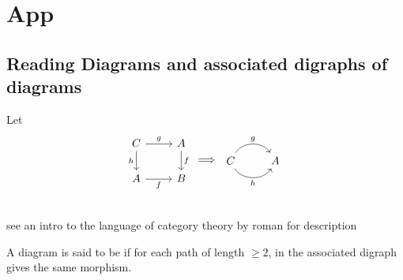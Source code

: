\documentclass{book}
\begin{document}
	
	
	
	
	
	
	
	
	
	
	
	
	
	
	
	
	
	
	
	
	
	
	
	
	
	
	
	
	
	
	
	\appendix
	\chapter{App}
	
	\section{Reading Diagrams and associated digraphs of diagrams}
	
	\begin{defn}
		Let 
		\[ 
		\begin{tikzcd}[baseline= 7]
			C \arrow[r, "g"] \arrow[d, "h"'] & A \arrow[d, "f"] \\
			A \arrow[r, "f"'] & B\\
		\end{tikzcd}
		\implies
		\begin{tikzcd}[baseline= 7]
			C \arrow[bend right=60, swap]{r}{h} \arrow[bend right=-60]{r}{g} & A  \\
		\end{tikzcd}
		\]
		
		see an intro to the language of category theory by roman for description
	\end{defn}
	
	
	\begin{defn}
		A diagram is said to be  if for each path of length $\geq 2$, in the associated digraph gives the same morphism.  
	\end{defn}
	
	
	
	\backmatter
	
	
	
	
	
	
	
	
	
	
	
	
	
	
\end{document}
